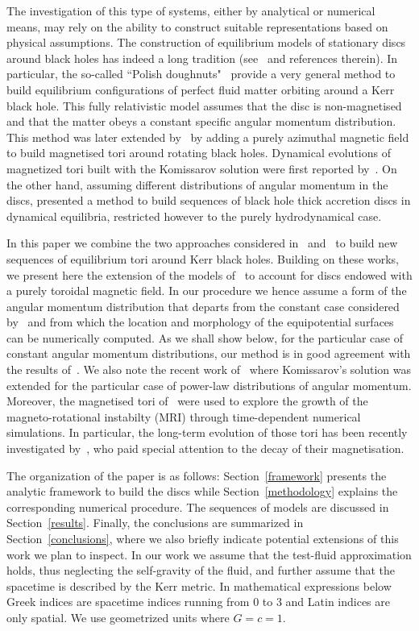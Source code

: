 \documentclass[referee]{aa}
\begin{document}
The investigation of this type of systems, either by analytical or numerical means, may rely on the ability to construct suitable 
representations based on physical assumptions. The construction of equilibrium models of stationary discs around black holes has indeed a long tradition (see~\cite{Abramowicz:2013} and references therein). In particular, the so-called ``Polish doughnuts"~\citep{Abramowicz:1978,Kozlowski:1978} provide a  very general method to build equilibrium configurations of perfect fluid matter orbiting around a Kerr black hole. This fully relativistic model assumes that the disc is non-magnetised and that the matter obeys a  constant specific angular momentum distribution. This method was later extended by~\cite{Komissarov:2006}  by adding a purely azimuthal magnetic field to build magnetised tori around rotating black holes. Dynamical evolutions of magnetized tori built with the Komissarov solution were first reported by~\cite{Montero:2007}.
On the other hand, assuming different distributions of angular momentum in the discs, \citet{Qian:2009} presented a method to build sequences of black hole thick accretion discs in dynamical equilibria, restricted however to the purely hydrodynamical case. 
 
 In this paper we combine the two approaches considered in~\cite{Komissarov:2006} and~\citet{Qian:2009} to build new sequences of equilibrium tori around Kerr black holes. Building on these works, we present here the extension of the models of~\citet{Qian:2009} to account for discs endowed with a purely toroidal magnetic field. In our procedure we hence assume a form of the angular momentum distribution that departs from the constant case considered by~\cite{Komissarov:2006} and from which the location and morphology of the equipotential surfaces can be numerically computed. As we shall show below, for the particular case of constant angular momentum distributions, our method is in good agreement with the results of~\citet{Komissarov:2006}. We also note the recent work of~\citet{Wielgus:2015} where Komissarov's solution was extended for the particular case of power-law distributions of angular momentum. Moreover, the magnetised tori of~\citet{Wielgus:2015} were used to explore the growth of the magneto-rotational instabilty (MRI) through time-dependent numerical simulations. In particular, the long-term evolution of those tori has been recently investigated by~\citet{Fragile:2017}, who paid special attention to the decay of their magnetisation. 

The organization of the paper is as follows: Section~\ref{framework} presents the analytic framework to build the discs while Section~\ref{methodology} explains the corresponding numerical procedure. The sequences of models are discussed in Section~\ref{results}. Finally, the conclusions are summarized in Section~\ref{conclusions}, where we also briefly indicate potential extensions of this work we plan to inspect. In our work we assume that the test-fluid approximation holds, thus neglecting the self-gravity of the fluid, and further assume that the spacetime is described by the Kerr metric. In mathematical expressions below Greek indices are spacetime indices running from 0 to 3 and Latin indices are only spatial. We use geometrized units where $G = c = 1$.
\end{document}
